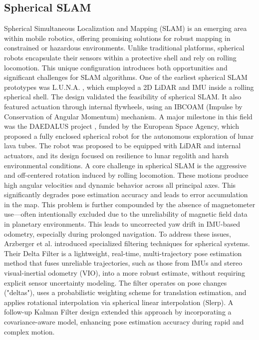 \documentclass[a4paper, conference]{IEEEtran}
\begin{document}
\subsection{Spherical SLAM}\label{AA}
Spherical Simultaneous Localization and Mapping (SLAM) is an emerging area within mobile robotics, offering promising solutions for robust mapping in constrained or hazardous environments. 
Unlike traditional platforms, spherical robots encapsulate their sensors within a protective shell and rely on rolling locomotion. 
This unique configuration introduces both opportunities and significant challenges for SLAM algorithms. 
One of the earliest spherical SLAM prototypes was L.U.N.A. \cite{luna}, which employed a 2D LiDAR and IMU inside a rolling spherical shell. 
The design validated the feasibility of spherical SLAM. 
It also featured actuation through internal flywheels, using an IBCOAM (Impulse by Conservation of Angular Momentum) mechanism.
A major milestone in this field was the DAEDALUS project \cite{DAEDALUS}, funded by the European Space Agency, which proposed a fully enclosed spherical robot for the autonomous exploration of lunar lava tubes. 
The robot was proposed to be equipped with LiDAR and internal actuators, and its design focused on resilience to lunar regolith and harsh environmental conditions.
A core challenge in spherical SLAM is the aggressive and off-centered rotation induced by rolling locomotion. 
These motions produce high angular velocities and dynamic behavior across all principal axes. 
This significantly degrades pose estimation accuracy and leads to error accumulation in the map. 
This problem is further compounded by the absence of magnetometer use—often intentionally excluded due to the unreliability of magnetic field data in planetary environments.
This leads to uncorrected yaw drift in IMU-based odometry, especially during prolonged navigation.
To address these issues, Arzberger et al. \cite{Kalman_filter_sphere,sphere_Fabi_1,DeltaFilter} introduced specialized filtering techniques for spherical systems. 
Their Delta Filter is a lightweight, real-time, multi-trajectory pose estimation method that fuses unreliable trajectories, such as those from IMUs and stereo visual-inertial odometry (VIO), into a more robust estimate, without requiring explicit sensor uncertainty modeling. 
The filter operates on pose changes ("deltas"), uses a probabilistic weighting scheme for translation estimation, and applies rotational interpolation via spherical linear interpolation (Slerp). 
A follow-up Kalman Filter design extended this approach by incorporating a covariance-aware model, enhancing pose estimation accuracy during rapid and complex motion.
\end{document}
